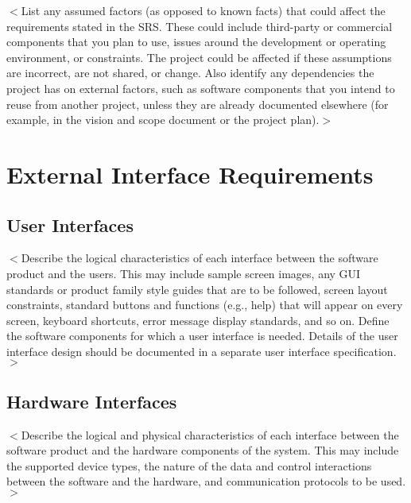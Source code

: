 \documentclass{scrreprt}
\begin{document}
$<$List any assumed factors (as opposed to known facts) that could affect the 
requirements stated in the SRS. These could include third-party or commercial 
components that you plan to use, issues around the development or operating 
environment, or constraints. The project could be affected if these assumptions 
are incorrect, are not shared, or change. Also identify any dependencies the 
project has on external factors, such as software components that you intend to 
reuse from another project, unless they are already documented elsewhere (for 
example, in the vision and scope document or the project plan).$>$


\chapter{External Interface Requirements}

\section{User Interfaces}
\begin{CJK}{UTF8}{<font>}
$<$Describe the logical characteristics of each interface between the software 
product and the users. This may include sample screen images, any GUI standards 
or product family style guides that are to be followed, screen layout 
constraints, standard buttons and functions (e.g., help) that will appear on 
every screen, keyboard shortcuts, error message display standards, and so on.  
Define the software components for which a user interface is needed. Details of 
the user interface design should be documented in a separate user interface 
specification.$>$
\end{CJK}

\section{Hardware Interfaces}
\begin{CJK}{UTF8}{<font>}
$<$Describe the logical and physical characteristics of each interface between 
the software product and the hardware components of the system. This may include 
the supported device types, the nature of the data and control interactions 
between the software and the hardware, and communication protocols to be 
used.$>$
\end{CJK}
\end{document}

